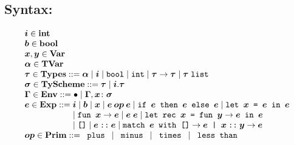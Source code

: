 \documentclass[11pt]{jarticle}
\begin{document}


\subsection*{Syntax:}

\[\begin{array}{l}
\PolyTypingMLivMV{i}[] \in \mathbf{int}\\
\PolyTypingMLivMV{b}[] \in \mathbf{bool}\\
\PolyTypingMLivMV{x}[], \PolyTypingMLivMV{y}[] \in
\mathbf{Var}\\
\PolyTypingMLivMV{a}[] \in \mathbf{TVar}\\
\PolyTypingMLivMV{t}[] \in \mathbf{Types} ::=
\PolyTypingMLivTyFVarTerm{\PolyTypingMLivMV{a}[]}
\mid \PolyTypingMLivTyBVarTerm{\PolyTypingMLivMV{i}[]}
\mid \PolyTypingMLivTyBoolTerm \mid \PolyTypingMLivTyIntTerm
\mid \PolyTypingMLivTyFunTerm{\PolyTypingMLivMV{t}[]}{\PolyTypingMLivMV{t}[]}
\mid \PolyTypingMLivTyListTerm{\PolyTypingMLivMV{t}[]}\\
\PolyTypingMLivMV{s}[] \in \mathbf{TyScheme} ::= \PolyTypingMLivMV{t}[]
\mid \PolyTypingMLivTySchemeTerm{\PolyTypingMLivMV{i}[]}
{\PolyTypingMLivMV{t}[]}\\
\PolyTypingMLivMV{env}[] \in \mathbf{Env} ::= \PolyTypingMLivEmptyTerm
\mid \PolyTypingMLivBindTerm{\PolyTypingMLivMV{env}[]}
{\PolyTypingMLivMV{x}[]}{\PolyTypingMLivMV{s}[]}\\
\PolyTypingMLivMV{e}[] \in \mathbf{Exp} ::= \PolyTypingMLivMV{i}[]
\mid \PolyTypingMLivMV{b}[] \mid \PolyTypingMLivMV{x}[]
\mid \PolyTypingMLivBinOpTerm{\PolyTypingMLivMV{op}[]}
{\PolyTypingMLivMV{e}[]}{\PolyTypingMLivMV{e}[]}
\mid \PolyTypingMLivIfTerm{\PolyTypingMLivMV{e}[]}{\PolyTypingMLivMV{e}[]}
{\PolyTypingMLivMV{e}[]} \mid \PolyTypingMLivLetTerm{\PolyTypingMLivMV{x}[]}
{\PolyTypingMLivMV{e}[]}{\PolyTypingMLivMV{e}[]}
 \\ \hspace*{2.0cm}
\mid \PolyTypingMLivAbsTerm{\PolyTypingMLivMV{x}[]}{\PolyTypingMLivMV{e}[]}
\mid \PolyTypingMLivAppTerm{\PolyTypingMLivMV{e}[]}{\PolyTypingMLivMV{e}[]}
\mid \PolyTypingMLivLetRecTerm{\PolyTypingMLivMV{x}[]}
{\PolyTypingMLivMV{y}[]}{\PolyTypingMLivMV{e}[]}{\PolyTypingMLivMV{e}[]}
 \\ \hspace*{2.0cm}
\mid \PolyTypingMLivNilTerm
\mid \PolyTypingMLivConsTerm{\PolyTypingMLivMV{e}[]}{\PolyTypingMLivMV{e}[]}
\mid \PolyTypingMLivMatchTerm{\PolyTypingMLivMV{e}[]}{\PolyTypingMLivMV{e}[]}
{\PolyTypingMLivMV{x}[]}{\PolyTypingMLivMV{y}[]}
{\PolyTypingMLivMV{e}[]}\\
\PolyTypingMLivMV{op}[] \in \mathbf{Prim} ::= \PolyTypingMLivPlusTerm
\mid \PolyTypingMLivMinusTerm \mid \PolyTypingMLivMultTerm
\mid \PolyTypingMLivLtTerm\\
\end{array}\]
\end{document}
